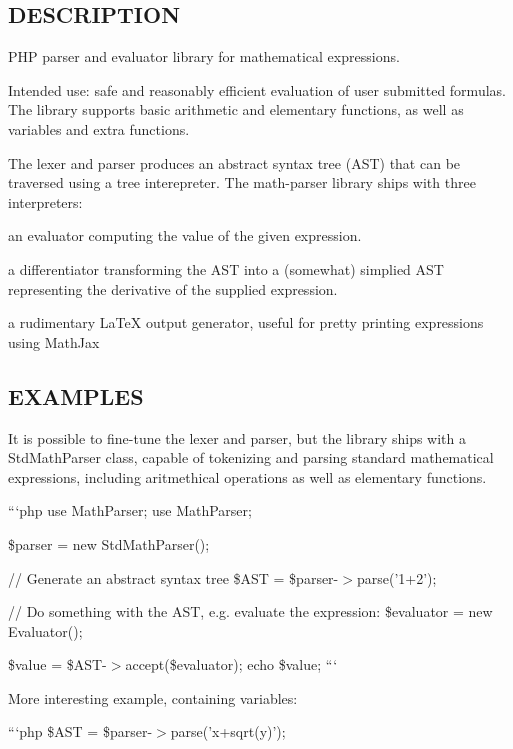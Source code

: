 \subsection*{D\-E\-S\-C\-R\-I\-P\-T\-I\-O\-N }

P\-H\-P parser and evaluator library for mathematical expressions.

Intended use\-: safe and reasonably efficient evaluation of user submitted formulas. The library supports basic arithmetic and elementary functions, as well as variables and extra functions.

The lexer and parser produces an abstract syntax tree (A\-S\-T) that can be traversed using a tree interepreter. The math-\/parser library ships with three interpreters\-:


\begin{DoxyItemize}
\item an evaluator computing the value of the given expression.
\item a differentiator transforming the A\-S\-T into a (somewhat) simplied A\-S\-T representing the derivative of the supplied expression.
\item a rudimentary La\-Te\-X output generator, useful for pretty printing expressions using Math\-Jax
\end{DoxyItemize}

\subsection*{E\-X\-A\-M\-P\-L\-E\-S }

It is possible to fine-\/tune the lexer and parser, but the library ships with a Std\-Math\-Parser class, capable of tokenizing and parsing standard mathematical expressions, including aritmethical operations as well as elementary functions.

```php use Math\-Parser; use Math\-Parser;

\$parser = new Std\-Math\-Parser();

// Generate an abstract syntax tree \$\-A\-S\-T = \$parser-\/$>$parse('1+2');

// Do something with the A\-S\-T, e.\-g. evaluate the expression\-: \$evaluator = new Evaluator();

\$value = \$\-A\-S\-T-\/$>$accept(\$evaluator); echo \$value; ```

More interesting example, containing variables\-:

```php \$\-A\-S\-T = \$parser-\/$>$parse('x+sqrt(y)');

